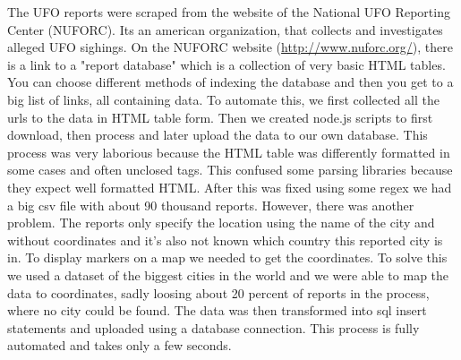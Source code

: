 \documentclass{article}
\begin{document}
The UFO reports were scraped from the website of the National UFO Reporting Center (NUFORC). Its an american organization, that collects and investigates alleged UFO sighings. On the NUFORC website (\url{http://www.nuforc.org/}), there is a link to a "report database" which is a collection of very basic HTML tables. You can choose different methods of indexing the database and then you get to a big list of links, all containing data. To automate this, we first collected all the urls to the data in HTML table form. Then we created node.js scripts to first download, then process and later upload the data to our own database. This process was very laborious because the HTML table was differently formatted in some cases and often unclosed tags. This confused some parsing libraries because they expect well formatted HTML. After this was fixed using some regex we had a big csv file with about 90 thousand reports. However, there was another problem. The reports only specify the location using the name of the city and without coordinates and it's also not known which country this reported city is in. To display markers on a map we needed to get the coordinates. To solve this we used a dataset of the biggest cities in the world and we were able to map the data to coordinates, sadly loosing about 20 percent of reports in the process, where no city could be found. The data was then transformed into sql insert statements and uploaded using a database connection. This process is fully automated and takes only a few seconds. 



\end{document}
